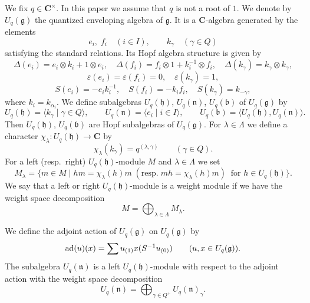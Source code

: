 \documentclass[a4paper, 12pt, leqno]{amsart}
\theoremstyle{definition}
\numberwithin{equation}{section}
\def\Gb{{\mathfrak{b}}}
\def\Gg{{\mathfrak{g}}}
\def\Gh{{\mathfrak{h}}}
\def\Gn{{\mathfrak{n}}}
\def\BC{{\mathbf{C}}}
\def\ad{{\mathop{\rm ad}\nolimits}}
\begin{document}
\subsection{}
We fix $q\in\BC^\times$.
In this paper we assume that $q$ is not a root of $1$.
We denote by $U_q(\Gg)$ the quantized enveloping algebra of $\Gg$.
It is a $\BC$-algebra generated by the elements 
\[
e_i, \; f_i\quad(i\in I),\qquad k_\gamma\quad(\gamma\in Q)
\]
satisfying the standard relations.
Its Hopf algebra structure is given by 
\[
\Delta(e_i)=e_i\otimes k_i+1\otimes e_i,
\quad
\Delta(f_i)=f_i\otimes 1+k_i^{-1}\otimes f_i,
\quad
\Delta(k_\gamma)=k_\gamma\otimes k_\gamma,
\]
\[
\varepsilon(e_i)=\varepsilon(f_i)=0,\quad\varepsilon(k_\gamma)=1,
\]
\[
S(e_i)=-e_ik_i^{-1},\quad
S(f_i)=-k_if_i,\quad
S(k_\gamma)=k_{-\gamma},
\]
where $k_i=k_{\alpha_i}$.
We define subalgebras $U_q(\Gh)$, $U_q(\Gn)$, $U_q(\Gb)$ of $U_q(\Gg)$ by
\[
U_q(\Gh)=\langle k_\gamma\mid \gamma\in Q\rangle,
\qquad
U_q(\Gn)=\langle e_i\mid i\in I\rangle,
\qquad
U_q(\Gb)=\langle U_q(\Gh), U_q(\Gn)\rangle.
\]
Then $U_q(\Gh)$, $U_q(\Gb)$ are  Hopf subalgebras of $U_q(\Gg)$.
For $\lambda\in\Lambda$ we define a character $\chi_\lambda:U_q(\Gh)\to \BC$ by 
\[
\chi_\lambda(k_\gamma)=q^{(\lambda,\gamma)}
\qquad(\gamma\in Q).
\]
For a left (resp.\ right) $U_q(\Gh)$-module $M$ and $\lambda\in\Lambda$ we set 
\[
M_\lambda=\{m\in M\mid hm=\chi_\lambda(h)m\;
(\text{resp.} \;
mh=\chi_\lambda(h)m)\;\;
\text{for } h\in U_q(\Gh)\}.
\]
We say that a left or right $U_q(\Gh)$-module is a weight module if we have the weight space decomposition
\[
M=\bigoplus_{\lambda\in\Lambda}M_\lambda.
\]


We define the adjoint action of $U_q(\Gg)$ on $U_q(\Gg)$ by
\[
\ad(u)(x)=\sum u_{(1)}x(S^{-1}u_{(0)})
\qquad (u, x\in U_q(\Gg)).
\]
The subalgebra $U_q(\Gn)$ is a left $U_q(\Gh)$-module with respect to the adjoint action with the weight space decomposition 
\[
U_q(\Gn)=\bigoplus_{\gamma\in Q^+}U_q(\Gn)_\gamma.
\]
\end{document}
